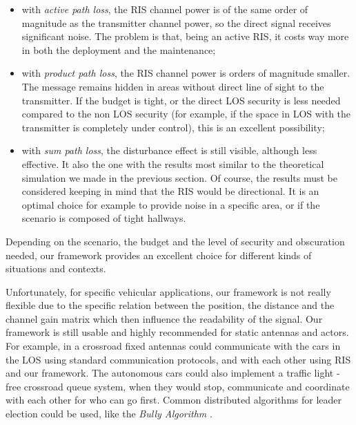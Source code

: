 \begin{itemize}
  \item with \textit{active path loss}, the RIS channel power is of the same order of magnitude as the transmitter channel power, so the direct signal receives significant noise. The problem is that, being an active RIS, it costs way more in both the deployment and the maintenance;
  \item with \textit{product path loss}, the RIS channel power is orders of magnitude smaller. The message remains hidden in areas without direct line of sight to the transmitter. If the budget is tight, or the direct LOS security is less needed compared to the non LOS security (for example, if the space in LOS with the transmitter is completely under control), this is an excellent possibility;
  \item with \textit{sum path loss}, the disturbance effect is still visible, although less effective. It also the one with the results most similar to the theoretical simulation we made in the previous section. Of course, the results must be considered keeping in mind that the RIS would be directional. It is an optimal choice for example to provide noise in a specific area, or if the scenario is composed of tight hallways.
\end{itemize}

Depending on the scenario, the budget and the level of security and obscuration needed, our framework provides an excellent choice for different kinds of situations and contexts.

Unfortunately, for specific vehicular applications, our framework is not really flexible due to the specific relation between the position, the distance and the channel gain matrix which then influence the readability of the signal. Our framework is still usable and highly recommended for static antennas and actors. For example, in a crossroad fixed antennas could communicate with the cars in the LOS using standard communication protocols, and with each other using RIS and our framework. The autonomous cars could also implement a traffic light - free crossroad queue system, when they would stop, communicate and coordinate with each other for who can go first. Common distributed algorithms for leader election could be used, like the \textit{Bully Algorithm} \cite{Bully_algorithm}.

